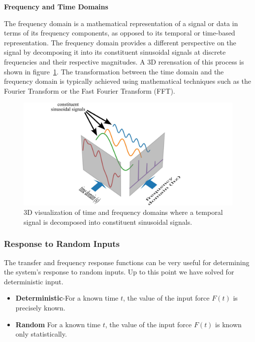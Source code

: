 \documentclass[12pt,letter]{article}
\begin{document}
\begin{review}
	\label{sec:TimeFrequencySpectrum}

	\textbf{Frequency and Time Domains}

	\noindent The frequency domain is a mathematical representation of a signal or data in terms of its frequency components, as opposed to its temporal or time-based representation. The frequency domain provides a different perspective on the signal by decomposing it into its constituent sinusoidal signals at discrete frequencies and their respective magnitudes. A 3D rerensation of this process is shown in figure~\ref{fig:3D_time_frequency_analysis}. The transformation between the time domain and the frequency domain is typically achieved using mathematical techniques such as the Fourier Transform or the Fast Fourier Transform (FFT).

		\begin{figure}[H]
			\centering
			\includegraphics[width=6in]{../figures/3D_time_frequency_analysis}
			\caption{3D visualization of time and frequency domains where a temporal signal is decomposed into constituent sinusoidal signals.}
			\label{fig:3D_time_frequency_analysis}
		\end{figure}

\end{review}


\subsubsection{Response to Random Inputs}
The transfer and frequency response functions can be very useful for determining the system's response to random inputs. Up to this point we have solved for deterministic input. 

\begin{itemize}
\item \textbf{Deterministic}-For a known time $t$, the value of the input force $F(t)$ is precisely known. 
\item \textbf{Random} For a known time $t$, the value of the input force $F(t)$ is known only statistically. 
\end{itemize}
\end{document}
